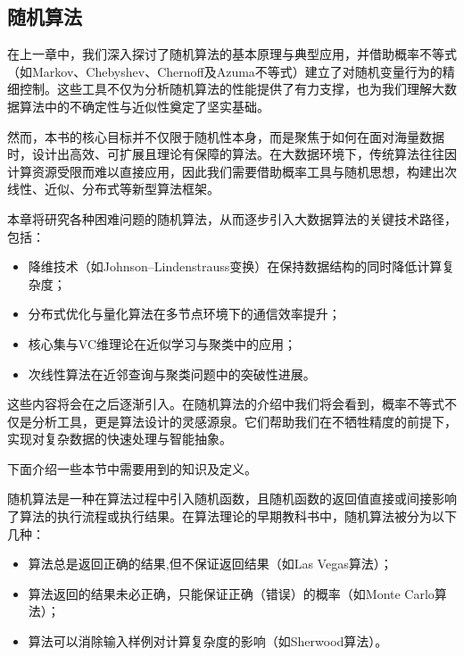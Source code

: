 \documentclass[lang=cn,newtx,10pt,scheme=chinese,chinesefont=nofont,citestyle=gb7714-2015, bibstyle=gb7714-2015]{elegantbook}
\begin{document}
\begin{refsection}
\printbibliography[heading=subbibliography, title={本章参考文献}]
\end{refsection}


\begin{refsection}

\chapter{随机算法}

在上一章中，我们深入探讨了随机算法的基本原理与典型应用，并借助概率不等式（如Markov、Chebyshev、Chernoff及Azuma不等式）建立了对随机变量行为的精细控制。这些工具不仅为分析随机算法的性能提供了有力支撑，也为我们理解大数据算法中的不确定性与近似性奠定了坚实基础。

然而，本书的核心目标并不仅限于随机性本身，而是聚焦于如何在面对海量数据时，设计出高效、可扩展且理论有保障的算法。在大数据环境下，传统算法往往因计算资源受限而难以直接应用，因此我们需要借助概率工具与随机思想，构建出次线性、近似、分布式等新型算法框架。

本章将研究各种困难问题的随机算法，从而逐步引入大数据算法的关键技术路径，包括：
\begin{itemize}
    \item  降维技术（如Johnson–Lindenstrauss变换）在保持数据结构的同时降低计算复杂度；
\item  分布式优化与量化算法在多节点环境下的通信效率提升；
\item   核心集与VC维理论在近似学习与聚类中的应用；
\item   次线性算法在近邻查询与聚类问题中的突破性进展。
\end{itemize}

这些内容将会在之后逐渐引入。在随机算法的介绍中我们将会看到，概率不等式不仅是分析工具，更是算法设计的灵感源泉。它们帮助我们在不牺牲精度的前提下，实现对复杂数据的快速处理与智能抽象。



下面介绍一些本节中需要用到的知识及定义。
\begin{definition}
    随机算法是一种在算法过程中引入随机函数，且随机函数的返回值直接或间接影响了算法的执行流程或执行结果。在算法理论的早期教科书\cite{brassard1988algorithmics}中，随机算法被分为以下几种：
    \begin{itemize}
        \item 算法总是返回正确的结果,但不保证返回结果（如Las Vegas算法）；
        \item 算法返回的结果未必正确，只能保证正确（错误）的概率（如Monte Carlo算法）；
        \item 算法可以消除输入样例对计算复杂度的影响（如Sherwood算法）。
    \end{itemize}
\end{definition}


\end{refsection}
\end{document}
